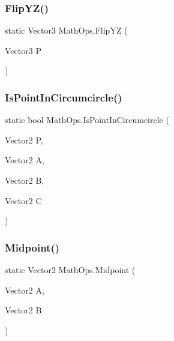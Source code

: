 \mbox{\label{class_math_ops_ab1c0982b962841b8e0e0505a30032091}} 
\subsubsection{\texorpdfstring{Flip\+Y\+Z()}{FlipYZ()}}
{\footnotesize\ttfamily static Vector3 Math\+Ops.\+Flip\+YZ (\begin{DoxyParamCaption}\item[{Vector3}]{P }\end{DoxyParamCaption})\hspace{0.3cm}{\ttfamily [static]}}

\mbox{\label{class_math_ops_a8add15f1367d790bc4ba29331a72bd32}} 
\subsubsection{\texorpdfstring{Is\+Point\+In\+Circumcircle()}{IsPointInCircumcircle()}}
{\footnotesize\ttfamily static bool Math\+Ops.\+Is\+Point\+In\+Circumcircle (\begin{DoxyParamCaption}\item[{Vector2}]{P,  }\item[{Vector2}]{A,  }\item[{Vector2}]{B,  }\item[{Vector2}]{C }\end{DoxyParamCaption})\hspace{0.3cm}{\ttfamily [static]}}

\mbox{\label{class_math_ops_a375da2b95a7a9cc75dd9413e2f6521d1}} 
\subsubsection{\texorpdfstring{Midpoint()}{Midpoint()}}
{\footnotesize\ttfamily static Vector2 Math\+Ops.\+Midpoint (\begin{DoxyParamCaption}\item[{Vector2}]{A,  }\item[{Vector2}]{B }\end{DoxyParamCaption})\hspace{0.3cm}{\ttfamily [static]}}

